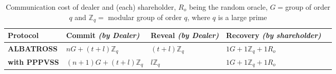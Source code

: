 \begin{table}[H]
\centering
\begin{tabular}{|p{3cm}|p{4cm}|p{3.5cm}|p{4cm}|p{1cm}|}
\hline
\textbf{Protocol}     & \textbf{Commit} \textit{(by Dealer)} & \textbf{Reveal} \textit{(by Dealer)} & \textbf{Recovery}  \textit{(by shareholder)}                                                      \\ \hline
\textbf{ALBATROSS}   & $nG+(t+l)\mathbb{Z}_q$ & $(t+l)\mathbb{Z}_q$ & $1G+1\mathbb{Z}_q+1R_o$ \\ \hline
\textbf{with PPPVSS}    & $(n+1)G+(t+l)\mathbb{Z}_q$ & $l\mathbb{Z}_q$ & $1G+1\mathbb{Z}_q+1R_o$ \\ \hline

\end{tabular}
\caption{Communication cost of dealer and (each) shareholder, $R_o$ being the random oracle, $G = $group of order $q$ and $\mathbb{Z}_q =$ modular group of order $q$, where $q$ is a large prime}
\label{tab:dealer_comm}
\end{table}
